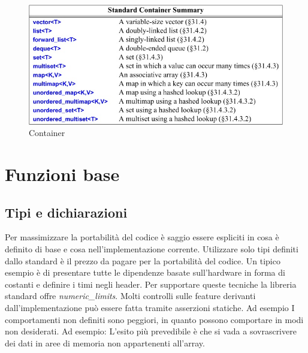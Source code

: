 \documentclass[11pt,a4paper]{book}
\begin{document}
\begin{figure}[h!]
	\begin{center}
		\includegraphics[scale=0.6]{img/007.jpg}
		\caption{Container}
		\label{fig: 007}
	\end{center}
\end{figure}

\chapter{Funzioni base}
\section{Tipi e dichiarazioni}
Per massimizzare la portabilità del codice è saggio essere espliciti in cosa è definito di base e cosa nell'implementazione corrente. Utilizzare solo tipi definiti dallo standard è il prezzo da pagare per la portabilità del codice. Un tipico esempio è di presentare tutte le dipendenze basate sull'hardware in forma di costanti e definire i timi negli header. Per supportare queste tecniche la libreria standard offre \emph{numeric\_limits}. Molti controlli sulle feature derivanti dall'implementazione può essere fatta tramite asserzioni statiche. Ad esempio
\label{code: 057}
I comportamenti non definiti sono peggiori, in quanto possono comportare in modi non desiderati. Ad esempio:
\label{code: 058}
L'esito più prevedibile è che si vada a sovrascrivere dei dati in aree di memoria non appartenenti all'array.
\end{document}
